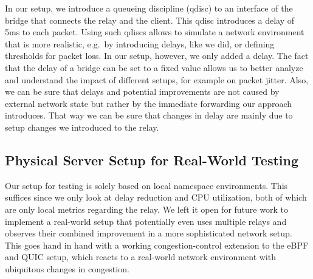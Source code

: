 
In our setup, we introduce a queueing discipline (qdisc) to an interface
of the bridge that connects the relay and the client.
This qdisc introduces a delay of 5ms to each packet.
Using such qdiscs allows to simulate a network environment that is more realistic, 
e.g.~by introducing delays, like we did, or defining thresholds for packet loss.
In our setup, however, we only added a delay. %
The fact that the delay of a bridge can be set to a fixed value allows us to better 
analyze and understand the impact of different setups, for example on packet jitter.
Also, we can be sure that delays and potential improvements are not caused by external
network state but rather by the immediate forwarding our approach introduces.
That way we can be sure that changes in delay are mainly due to setup changes 
we introduced to the relay.

\subsection{Physical Server Setup for Real-World Testing}\label{subsec:physical_server_setup}
Our setup for testing is solely based on local namespace environments.
This suffices since we only look at delay reduction and CPU utilization, 
both of which are only local metrics regarding the relay.
We left it open for future work to implement a real-world setup that 
potentially even uses multiple relays and observes their combined improvement
in a more sophisticated network setup.
This goes hand in hand with a working congestion-control extension to the eBPF and 
QUIC setup, which reacts to a real-world network environment with ubiquitous changes 
in congestion.
